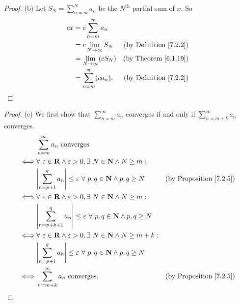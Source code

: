 \begin{proof}{(b)}
Let \(S_N = \sum_{n = m}^N a_n\) be the \(N^{\text{th}}\) partial sum of \(x\).
So
\begin{align*}
cx &= c \sum_{n = m}^\infty a_n \\
&= c \lim_{N \to \infty} S_N & \text{(by Definition \ref{7.2.2})} \\
&= \lim_{N \to \infty} (c S_N) & \text{(by Theorem \ref{6.1.19})} \\
&= \sum_{n = m}^\infty (c a_n). & \text{(by Definition \ref{7.2.2})}
\end{align*}
\end{proof}

\begin{proof}{(c)}
We first show that \(\sum_{n = m}^\infty a_n\) converges if and only if \(\sum_{n = m + k}^\infty a_n\) converges.
\begin{align*}
& \sum_{n = m}^\infty a_n \text{ converges} \\
\iff & \forall\ \varepsilon \in \mathbf{R} \land \varepsilon > 0, \exists\ N \in \mathbf{N} \land N \geq m : \\
& \abs*{\sum_{n = p + 1}^q a_n} \leq \varepsilon \ \forall\ p, q \in \mathbf{N} \land p, q \geq N & \text{(by Proposition \ref{7.2.5})} \\
\iff & \forall\ \varepsilon \in \mathbf{R} \land \varepsilon > 0, \exists\ N \in \mathbf{N} \land N \geq m : \\
& \abs*{\sum_{n = p + k + 1}^q a_n} \leq \varepsilon \ \forall\ p, q \in \mathbf{N} \land p, q \geq N \\
\iff & \forall\ \varepsilon \in \mathbf{R} \land \varepsilon > 0, \exists\ N \in \mathbf{N} \land N \geq m + k : \\
& \abs*{\sum_{n = p + 1}^q a_n} \leq \varepsilon \ \forall\ p, q \in \mathbf{N} \land p, q \geq N \\
\iff & \sum_{n = m + k}^\infty a_n \text{ converges}. & \text{(by Proposition \ref{7.2.5})}
\end{align*}


\end{proof}
